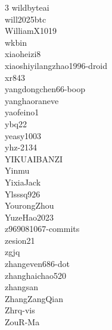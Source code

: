 \documentclass{llmxive}
\begin{document}
\begin{multicols}{3}
wildbyteai\\
will2025btc\\
WilliamX1019\\
wkbin\\
xiaoheizi8\\
xiaoshiyilangzhao1996-droid\\
xr843\\
yangdongchen66-boop\\
yanghaoraneve\\
yaofeino1\\
ybq22\\
yeasy1003\\
yhz-2134\\
YIKUAIBANZI\\
Yinmu\\
YixiaJack\\
Ylsssq926\\
YourongZhou\\
YuzeHao2023\\
z969081067-commits\\
zesion21\\
zgjq\\
zhangeven686-dot\\
zhanghaichao520\\
zhangsan\\
ZhangZangQian\\
Zhrq-vis\\
ZouR-Ma
\end{multicols}
\endgroup



\end{document}
